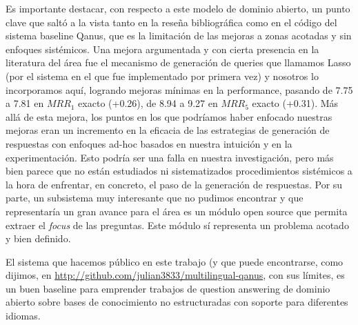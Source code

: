 Es importante destacar, con respecto a este modelo de dominio abierto, un punto clave que saltó a la vista tanto en la reseña bibliográfica como en el código del sistema baseline Qanus, que es la limitación de las mejoras a zonas acotadas y sin enfoques sistémicos. Una mejora argumentada y con cierta presencia en la literatura del área fue el mecanismo de generación de queries que llamamos Lasso (por el sistema en el que fue implementado por primera vez) y nosotros lo incorporamos aquí, logrando mejoras mínimas en la performance, pasando de 7.75 a 7.81 en $MRR_1$ exacto (+0.26), de 8.94 a 9.27 en $MRR_5$ exacto (+0.31). Más allá de esta mejora, los puntos en los que podríamos haber enfocado nuestras mejoras eran un incremento en la eficacia de las estrategias de generación de respuestas con enfoques ad-hoc basados en nuestra intuición y en la experimentación. Esto podría ser una falla en nuestra investigación, pero más bien parece que no están estudiados ni sistematizados procedimientos sistémicos a la hora de enfrentar, en concreto, el paso de la generación de respuestas. Por su parte, un subsistema muy interesante que no pudimos encontrar y que representaría un gran avance para el área es un módulo open source que permita extraer el \textit{focus} de las preguntas. Este módulo sí representa un problema acotado y bien definido.

El sistema que hacemos público en este trabajo (y que puede encontrarse, como dijimos, en \url{http://github.com/julian3833/multilingual-qanus}, con sus límites, es un buen baseline para emprender trabajos de question answering de dominio abierto sobre bases de conocimiento no estructuradas con soporte para diferentes idiomas.

